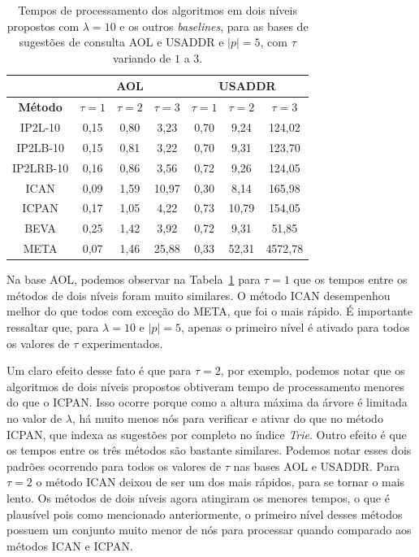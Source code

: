 \begin{table}[h]
\centering
\begin{tabular}{c|c|c|c|c|c|c|}
\cline{2-7}
\multicolumn{1}{l|}{} & \multicolumn{3}{c|}{\textbf{AOL}} & \multicolumn{3}{c|}{\textbf{USADDR}} \\ \hline
\multicolumn{1}{|c|}{\textbf{Método}} & $\tau=1$ & $\tau=2$ & $\tau=3$ & $\tau=1$ & $\tau=2$ & $\tau=3$ \\ \hline
\multicolumn{1}{|c|}{IP2L-10} & 0,15 & 0,80 & 3,23 & 0,70 & 9,24 & 124,02 \\ \hline
\multicolumn{1}{|c|}{IP2LB-10} & 0,15 & 0,81 & 3,22 & 0,70 & 9,31 & 123,70 \\ \hline
\multicolumn{1}{|c|}{IP2LRB-10} & 0,16 & 0,86 & 3,56 & 0,72 & 9,26 & 124,05 \\ \hline
\multicolumn{1}{|c|}{ICAN} & 0,09 & 1,59 & 10,97 & 0,30 & 8,14 & 165,98 \\ \hline
\multicolumn{1}{|c|}{ICPAN} & 0,17 & 1,05 & 4,22 & 0,73 & 10,79 & 154,05 \\ \hline
\multicolumn{1}{|c|}{BEVA} & 0,25 & 1,42 & 3,92 & 0,72 & 9,31 & 51,85 \\ \hline
\multicolumn{1}{|c|}{META} & 0,07 & 1,46 & 25,88 & 0,33 & 52,31 & 4572,78 \\ \hline
\end{tabular}
\caption{Tempos de processamento dos algoritmos em dois níveis propostos com $\lambda=10$ e os outros \textit{baselines}, para as bases de sugestões de consulta AOL e USADDR e $|p|=5$, com $\tau$ variando de $1$ a $3$.}
\label{tab:baselines-varying-tau-p-5}
\end{table}

Na base AOL, podemos observar na Tabela~\ref{tab:baselines-varying-tau-p-5} para $\tau=1$ que os tempos entre os métodos de dois níveis foram muito similares. O método ICAN desempenhou melhor do que todos com exceção do META, que foi o mais rápido. É importante ressaltar que, para $\lambda=10$ e $|p|=5$, apenas o primeiro nível é ativado para todos os valores de $\tau$ experimentados. 

Um claro efeito desse fato é que para $\tau=2$, por exemplo, podemos notar que os algoritmos de dois níveis propostos obtiveram tempo de processamento menores do que o ICPAN. Isso ocorre porque como a altura máxima da árvore é limitada no valor de $\lambda$, há muito menos nós para verificar e ativar do que no método ICPAN, que indexa as sugestões por completo no índice \textit{Trie}. Outro efeito é que os tempos entre os três métodos são bastante similares. Podemos notar esses dois padrões ocorrendo para todos os valores de $\tau$ nas bases AOL e USADDR. Para $\tau=2$ o método ICAN deixou de ser um dos mais rápidos, para se tornar o mais lento. Os métodos de dois níveis agora atingiram os menores tempos, o que é plausível pois como mencionado anteriormente, o primeiro nível desses métodos possuem um conjunto muito menor de nós para processar quando comparado aos métodos ICAN e ICPAN. 

